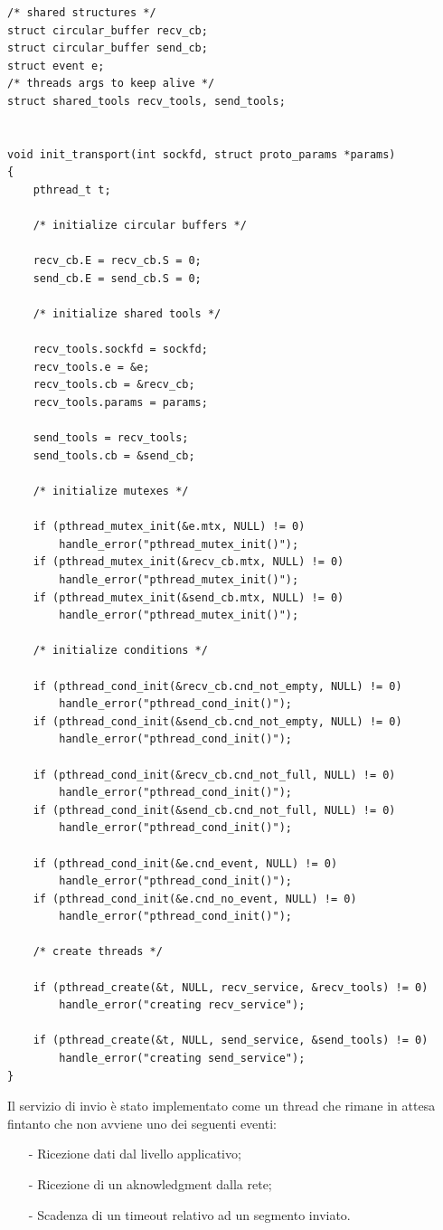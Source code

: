 \begin{lstlisting}[title=transport.c]
/* shared structures */
struct circular_buffer recv_cb;
struct circular_buffer send_cb;
struct event e;
/* threads args to keep alive */
struct shared_tools recv_tools, send_tools;


void init_transport(int sockfd, struct proto_params *params)
{
    pthread_t t;

    /* initialize circular buffers */

    recv_cb.E = recv_cb.S = 0;
    send_cb.E = send_cb.S = 0;

    /* initialize shared tools */

    recv_tools.sockfd = sockfd;
    recv_tools.e = &e;
    recv_tools.cb = &recv_cb;
    recv_tools.params = params;

    send_tools = recv_tools;
    send_tools.cb = &send_cb;

    /* initialize mutexes */

    if (pthread_mutex_init(&e.mtx, NULL) != 0)
        handle_error("pthread_mutex_init()");
    if (pthread_mutex_init(&recv_cb.mtx, NULL) != 0)
        handle_error("pthread_mutex_init()");
    if (pthread_mutex_init(&send_cb.mtx, NULL) != 0)
        handle_error("pthread_mutex_init()");

    /* initialize conditions */

    if (pthread_cond_init(&recv_cb.cnd_not_empty, NULL) != 0)
        handle_error("pthread_cond_init()");
    if (pthread_cond_init(&send_cb.cnd_not_empty, NULL) != 0)
        handle_error("pthread_cond_init()");

    if (pthread_cond_init(&recv_cb.cnd_not_full, NULL) != 0)
        handle_error("pthread_cond_init()");
    if (pthread_cond_init(&send_cb.cnd_not_full, NULL) != 0)
        handle_error("pthread_cond_init()");

    if (pthread_cond_init(&e.cnd_event, NULL) != 0)
        handle_error("pthread_cond_init()");
    if (pthread_cond_init(&e.cnd_no_event, NULL) != 0)
        handle_error("pthread_cond_init()");

    /* create threads */

    if (pthread_create(&t, NULL, recv_service, &recv_tools) != 0)
        handle_error("creating recv_service");

    if (pthread_create(&t, NULL, send_service, &send_tools) != 0)
        handle_error("creating send_service");
}
\end{lstlisting}

Il servizio di invio è stato implementato come un thread che rimane in attesa
fintanto che non avviene uno dei seguenti eventi:
\begin{itemize}
\item[-]Ricezione dati dal livello applicativo;
\item[-]Ricezione di un aknowledgment dalla rete;
\item[-]Scadenza di un timeout relativo ad un segmento inviato.
\end{itemize}

